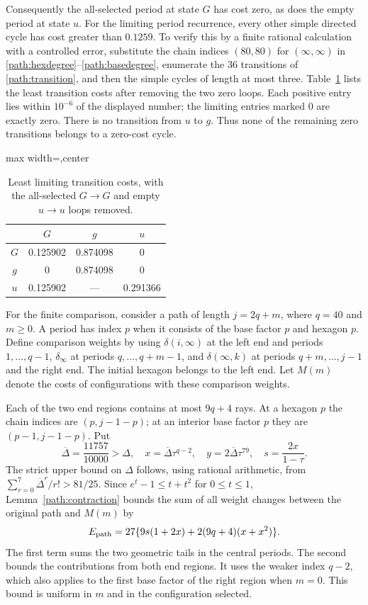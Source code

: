 Consequently the all-selected period at state $G$ has cost zero, as does
the empty period at state $u$. For the limiting period recurrence, every
other simple directed cycle has cost greater than $0.1259$. To verify this
by a finite rational calculation with a controlled error, substitute the chain
indices $(80,80)$ for $(\infty,\infty)$ in
\eqref{path:hexdegree}--\eqref{path:basedegree}, enumerate the $36$
transitions of \eqref{path:transition}, and then the simple cycles of
length at most three. Table~\ref{path:cycles} lists the least transition
costs after removing the two zero loops. Each positive entry lies within
$10^{-6}$ of the displayed number; the limiting entries marked $0$ are
exactly zero. There is no transition from $u$ to $g$. Thus none of the
remaining zero transitions belongs to a zero-cost cycle.

\begin{table}[ht]
\centering
\caption{Least limiting transition costs, with the all-selected $G\to G$
and empty $u\to u$ loops removed.}
\label{path:cycles}
\begin{adjustbox}{max width=\textwidth,center}
\begin{tabular}{c|ccc}
&$G$&$g$&$u$\\\hline
$G$&0.125902&0.874098&0\\
$g$&0&0.874098&0\\
$u$&0.125902&---&0.291366
\end{tabular}
\end{adjustbox}
\end{table}

For the finite comparison, consider a path of length $j=2q+m$, where
$q=40$ and $m\ge0$. A period has index $p$ when it consists of the base
factor $p$ and hexagon $p$. Define comparison weights by using
$\delta(i,\infty)$ at the left end and periods $1,\ldots,q-1$,
$\delta_\infty$ at periods $q,\ldots,q+m-1$, and
$\delta(\infty,k)$ at periods $q+m,\ldots,j-1$ and the right end.
The initial hexagon belongs to the left end. Let $M(m)$ denote the costs
of configurations with these comparison weights.

Each of the two end regions contains at most $9q+4$ rays. At a hexagon $p$
the chain indices are $(p,j-1-p)$; at an interior base factor $p$ they are
$(p-1,j-1-p)$. Put
\[
 \overline\Delta=\frac{11757}{10000}>\Delta,\quad
 x=\overline\Delta\tau^{q-2},\quad
 y=2\overline\Delta\tau^{79},\quad s=\frac{2x}{1-\tau}.
\]
The strict upper bound on $\Delta$ follows, using rational arithmetic, from
$\sum_{r=0}^7\overline\Delta^r/r!>81/25$.
Since $e^t-1\le t+t^2$ for $0\le t\le1$, Lemma~\ref{path:contraction}
bounds the sum of all weight changes between the original path and $M(m)$ by
\begin{equation}\label{path:error}
 E_{\rm path}=27\{9s(1+2x)+2(9q+4)(x+x^2)\}.
\end{equation}
The first term sums the two geometric tails in the central periods. The
second bounds the contributions from both end regions. It uses the weaker
index $q-2$, which also applies to the first base factor of the right
region when $m=0$.
This bound is uniform in $m$ and in the configuration selected.

